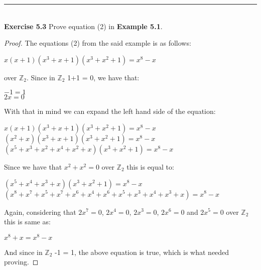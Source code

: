 \documentclass{article}
\begin{document}
\noindent\rule{12cm}{0.4pt}\\
\noindent \textbf{Exercise 5.3} Prove equation (2) in \textbf{Example 5.1}.
\begin{proof}
The equations (2) from the said example is as follows:
\begin{center}
$x(x + 1)(x^3 + x + 1)(x^3 + x^2 + 1) = x^8 - x$
\end{center}
over $\mathbb{Z}_{2}$. Since in $\mathbb{Z}_{2}$ 1+1 = 0, we have that:
\begin{center}
$-1 = 1$\\
$2x = 0$
\end{center}
With that in mind we can expand the left hand side of the equation:
\begin{center}
$x(x + 1)(x^3 + x + 1)(x^3 + x^2 + 1) = x^8 - x$\\
$(x^2 + x)(x^3 + x + 1)(x^3 + x^2 + 1) = x^8 - x$\\
$(x^5 + x^3 + x^2 + x^4 + x^2 + x)(x^3 + x^2 + 1) = x^8 - x$
\end{center}
Since we have that $x^2 + x^2 = 0$ over $\mathbb{Z}_{2}$ this is equal to:
\begin{center}
$(x^5 + x^4 + x^3 + x)(x^3 + x^2 + 1) = x^8 - x$\\
$(x^8 + x^7 + x^5 + x^7 + x^6 + x^4 + x^6 + x^5 + x^3 + x^4 + x^3 + x) = x^8 - x$
\end{center}
Again, considering that $2x^7=0$, $2x^4 = 0$, $2x^3 = 0$, $2x^6 = 0$ and $2x^5=0$ over $\mathbb{Z}_{2}$ this is same as:
\begin{center}
$x^8 + x = x^8 - x$
\end{center}
And since in $\mathbb{Z}_{2}$ -1 = 1, the above equation is true, which is what needed proving.
\end{proof}
\end{document}

